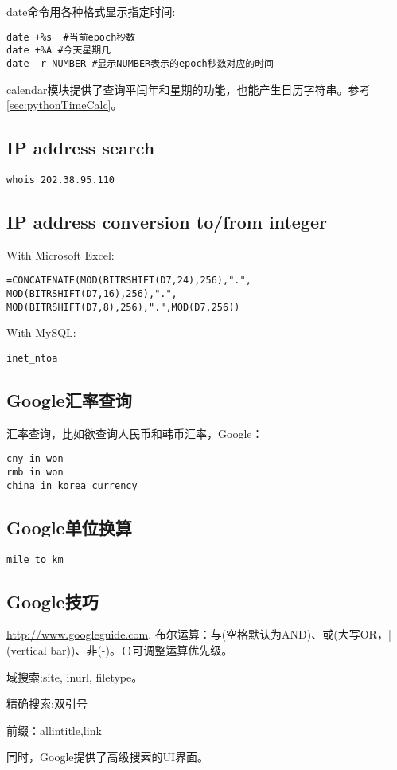 date命令用各种格式显示指定时间:
\begin{verbatim}
date +%s  #当前epoch秒数
date +%A #今天星期几
date -r NUMBER #显示NUMBER表示的epoch秒数对应的时间
\end{verbatim}


calendar模块提供了查询平闰年和星期的功能，也能产生日历字符串。参考\ref{sec:pythonTimeCalc}。

\subsection{IP address search}
\begin{verbatim}
whois 202.38.95.110
\end{verbatim}

\subsection{IP address conversion to/from integer}

With Microsoft Excel:
\begin{verbatim}
=CONCATENATE(MOD(BITRSHIFT(D7,24),256),".",
MOD(BITRSHIFT(D7,16),256),".",
MOD(BITRSHIFT(D7,8),256),".",MOD(D7,256))
\end{verbatim}

With MySQL:

\begin{verbatim}
inet_ntoa
\end{verbatim}

\subsection{Google汇率查询}
汇率查询，比如欲查询人民币和韩币汇率，Google：
\begin{verbatim}
cny in won
rmb in won
china in korea currency
\end{verbatim}

\subsection{Google单位换算}
\begin{verbatim}
mile to km
\end{verbatim}

\subsection{Google技巧}
\url{http://www.googleguide.com}.
布尔运算：与(空格默认为AND)、或(大写OR，|(vertical bar))、非(-)。\verb+()+可调整运算优先级。

域搜索:site, inurl, filetype。

精确搜索:双引号

前缀：allintitle,link

同时，Google提供了高级搜索的UI界面。

























